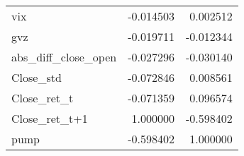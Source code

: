 \begin{tabular}{lrr}
vix                  &      -0.014503 &  0.002512 \\
gvz                  &      -0.019711 & -0.012344 \\
abs\_diff\_close\_open  &      -0.027296 & -0.030140 \\
Close\_std            &      -0.072846 &  0.008561 \\
Close\_ret\_t          &      -0.071359 &  0.096574 \\
Close\_ret\_t+1        &       1.000000 & -0.598402 \\
pump                 &      -0.598402 &  1.000000 \\
\bottomrule
\end{tabular}
